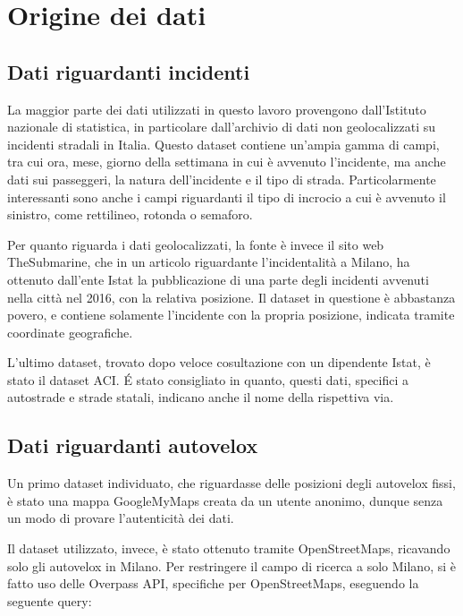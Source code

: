 \documentclass[a4paper]{report}
\begin{document}
\section{Origine dei dati}

\subsection{Dati riguardanti incidenti}
La maggior parte dei dati utilizzati in questo lavoro provengono 
dall'Istituto nazionale di statistica, 
in particolare dall'archivio di dati non geolocalizzati su incidenti stradali in Italia.
Questo dataset contiene un'ampia gamma di campi, tra cui ora, 
mese, giorno della settimana in cui è avvenuto l'incidente, 
ma anche dati sui passeggeri, la natura dell'incidente e il tipo di strada. 
Particolarmente interessanti sono anche i campi riguardanti il tipo di incrocio a cui è 
avvenuto il sinistro, come rettilineo, rotonda o semaforo.

Per quanto riguarda i dati geolocalizzati, la fonte è invece il sito web TheSubmarine, %
che in un articolo riguardante l'incidentalità a Milano, 
ha ottenuto dall'ente Istat la pubblicazione di una parte degli 
incidenti avvenuti nella città nel 2016, con la relativa posizione.
Il dataset in questione è abbastanza povero, e contiene solamente l'incidente con la 
propria posizione, indicata tramite coordinate geografiche.

L'ultimo dataset, trovato dopo veloce cosultazione con un dipendente Istat, è stato 
il dataset ACI.
\'E stato consigliato in quanto, questi dati, specifici a autostrade e strade statali, 
indicano anche il nome della rispettiva via.

\subsection{Dati riguardanti autovelox}
Un primo dataset individuato, che riguardasse delle posizioni degli autovelox fissi, 
è stato una mappa GoogleMyMaps creata da un utente anonimo, 
dunque senza un modo di provare l'autenticità dei dati.

Il dataset utilizzato, invece, è stato ottenuto tramite OpenStreetMaps, ricavando solo gli autovelox 
in Milano. 
Per restringere il campo di ricerca a solo Milano, si è fatto uso delle Overpass API, specifiche per 
OpenStreetMaps, eseguendo la seguente query: 
\end{document}
